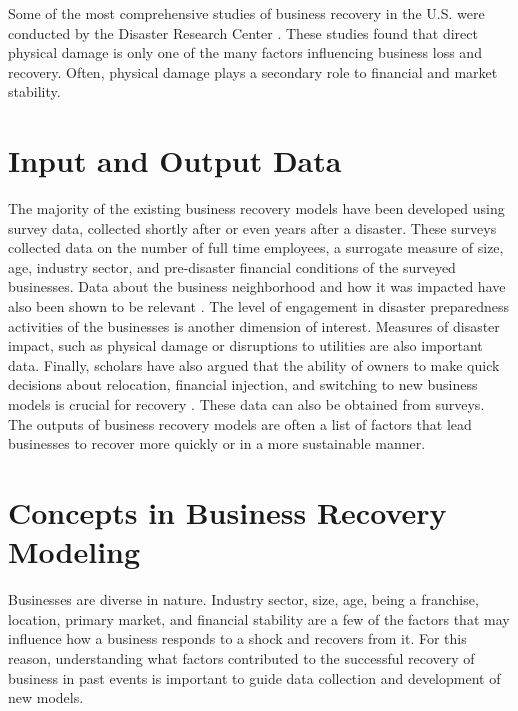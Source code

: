 Some of the most comprehensive studies of business recovery in the U.S. were conducted by the Disaster Research Center \citep{webb2000businesses}. These studies found that direct physical damage is only one of the many factors influencing business loss and recovery. Often, physical damage plays a secondary role to financial and market stability.\ 

\section{Input and Output Data} 
The majority of the existing business recovery models have been developed using survey data, collected shortly after or even years after a disaster. These surveys collected data on the number of full time employees, a surrogate measure of size, age, industry sector, and pre-disaster financial conditions of the surveyed businesses. Data about the business neighborhood and how it was impacted have also been shown to be relevant \citep{chang2010urban}. The level of engagement in disaster preparedness activities of the businesses is another dimension of interest. Measures of disaster impact, such as physical damage or disruptions to utilities are also important data. Finally, scholars have also argued that the ability of owners to make quick decisions about relocation, financial injection, and switching to new business models is crucial for recovery \citep{stevenson2014organizational, morrish2011entrepreneurial}. These data can also be obtained from surveys. The outputs of business recovery models are often a list of factors that lead businesses to recover more quickly or in a more sustainable manner.\

\section{Concepts in Business Recovery Modeling} 
Businesses are diverse in nature. Industry sector, size, age, being a franchise, location, primary market, and financial stability are a few of the factors that may influence how a business responds to a shock and recovers from it. For this reason, understanding what factors contributed to the successful recovery of business in past events is important to guide data collection and development of new models.\ 

